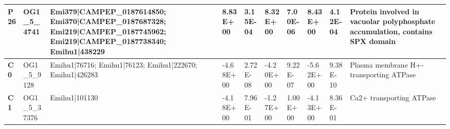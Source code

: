 \begin{landscape}
\begin{center}
\begin{footnotesize}
\begin{longtable}{|p{0.5cm}|p{1.5cm}|p{4cm}|l|l|l|l|l|l|l|}
\textbf{P26} & OG1\_5\_4741  & Emi379|CAMPEP\_0187614850; Emi370|CAMPEP\_0187687328; Emi219|CAMPEP\_0187745962; Emi219|CAMPEP\_0187738340; Emihu1|438229                                                                                                                                                                                                                                                                                                                                                                                                                                                                                                                & 8.83E+00  & 3.15E-04 & 8.32E+00  & 7.00E-06 & 8.43E+00  & 4.12E-04 & Protein involved in vacuolar polyphosphate accumulation, contains SPX domain \\ \hline
\textbf{C0}  & OG1\_5\_9128  & Emihu1|76716; Emihu1|76123; Emihu1|222670; Emihu1|426283                                                                                                                                                                                                                                                                                                                                                                                                                                                                                                                                                                                 & -4.68E+00 & 2.72E-08 & -4.20E+00 & 9.22E-07 & -5.62E+00 & 9.38E-10 & Plasma membrane H+-transporting ATPase                                       \\ \hline
\textbf{C1}  & OG1\_5\_37376 & Emihu1|101130                                                                                                                                                                                                                                                                                                                                                                                                                                                                                                                                                                                                                            & -4.18E+00 & 7.96E-01 & -1.27E+00 & 1.00E+00 & -4.13E+00 & 8.36E-01 & Ca2+ transporting ATPase                                                     \\ \hline

\end{longtable}
\end{footnotesize}
\end{center}
\end{landscape}
